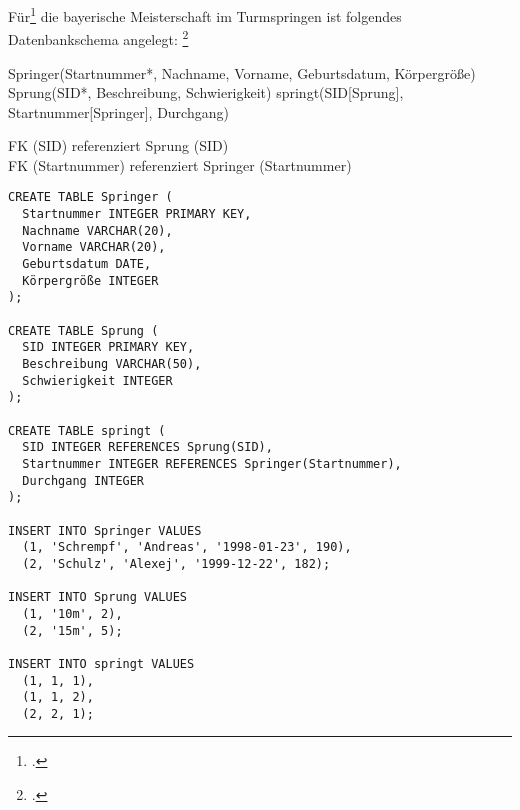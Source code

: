 \documentclass{bschlangaul-aufgabe}
\begin{document}

\noindent
Für\footcite[Thema 2 Teilaufgabe 2 Aufgabe
4]{examen:46116:2017:09} die bayerische Meisterschaft im Turmspringen
ist folgendes Datenbankschema angelegt:
\footcite{db:ab:2}

\begin{liRelationenSchemaFormat}
Springer(Startnummer*, Nachname, Vorname, Geburtsdatum, Körpergröße)
Sprung(SID*, Beschreibung, Schwierigkeit)
springt(SID[Sprung], Startnummer[Springer], Durchgang)
\end{liRelationenSchemaFormat}

\begin{liRmodell}



FK (SID) referenziert Sprung (SID)\\
FK (Startnummer) referenziert Springer (Startnummer)
\end{liRmodell}

\begin{bAdditum}[Übungsdatenbank]
\begin{verbatim}
CREATE TABLE Springer (
  Startnummer INTEGER PRIMARY KEY,
  Nachname VARCHAR(20),
  Vorname VARCHAR(20),
  Geburtsdatum DATE,
  Körpergröße INTEGER
);

CREATE TABLE Sprung (
  SID INTEGER PRIMARY KEY,
  Beschreibung VARCHAR(50),
  Schwierigkeit INTEGER
);

CREATE TABLE springt (
  SID INTEGER REFERENCES Sprung(SID),
  Startnummer INTEGER REFERENCES Springer(Startnummer),
  Durchgang INTEGER
);

INSERT INTO Springer VALUES
  (1, 'Schrempf', 'Andreas', '1998-01-23', 190),
  (2, 'Schulz', 'Alexej', '1999-12-22', 182);

INSERT INTO Sprung VALUES
  (1, '10m', 2),
  (2, '15m', 5);

INSERT INTO springt VALUES
  (1, 1, 1),
  (1, 1, 2),
  (2, 2, 1);
\end{verbatim}
\end{bAdditum}
\end{document}
